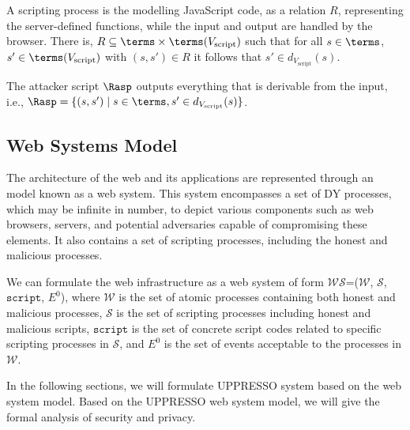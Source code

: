 \begin{definition}
 A scripting process is the modelling JavaScript code, as a relation $R$, representing the server-defined functions, while the input and output are handled by the browser. There is, $R\subseteq \terms \times
  \terms(V_{\text{script}})$ such that for all $s \in \terms$, $s' \in \terms(V_{\text{script}})$ with $(s, s') \in R$ it follows that $s'\in d_{V_{\text{script}}}(s)$.
\end{definition}

\begin{definition}
  The attacker script $\Rasp$ outputs everything that is derivable
  from the input, i.e., $\Rasp=\{(s, s')\mid s\in \terms, s'\in
  d_{V_{\text{script}}}(s)\}$.
\end{definition}


\subsection{Web Systems Model}
\label{app:websystemmodel}


The architecture of the web and its applications are represented through an model known as a web system. This system encompasses a set of DY processes, which may be infinite in number, to depict various components such as web browsers, servers, and potential adversaries capable of compromising these elements.
It also contains a set of scripting processes, including the honest and malicious processes.

\begin{definition}
We can formulate the web infrastructure as a web system of form $\mathcal{WS}$=($\mathcal{W}$, $\mathcal{S}$, $\mathtt{script}$, $E^0$), where $\mathcal{W}$ is the set of atomic processes containing both honest and malicious processes, $\mathcal{S}$ is the set of scripting processes including honest and malicious scripts, $\mathtt{script}$ is the set of concrete script codes related to specific scripting processes in $\mathcal{S}$, and $E^0$ is the set of events acceptable to the processes in $\mathcal{W}$.
\end{definition}

In the following sections, we will formulate UPPRESSO system based on the web system model. Based on the UPPRESSO web system model, we will give the formal analysis of security and privacy.  

